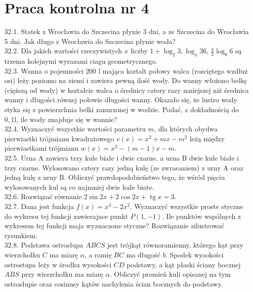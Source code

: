 \documentclass[10pt]{article}
\begin{document}
\section*{Praca kontrolna nr 4}
32.1. Statek z Wrocławia do Szczecina płynie 3 dni, a ze Szczecina do Wrocławia 5 dni. Jak długo z Wrocławia do Szczecina płynie woda?\\
32.2. Dla jakich wartości rzeczywistych $x$ liczby $1+\log _{2} 3, \log _{x} 36$, $\frac{4}{3} \log _{8} 6$ są trzema kolejnymi wyrazami ciagu geometrycznego.\\
32.3. Wanna o pojemności 200 l mająca ksztalt połowy walca (rozciętego wzdłuż osi) leży poziomo na ziemi i zawiera pewną ilość wody. Do wanny włożono belkę (cięższą od wody) w kształcie walca o średnicy cztery razy mniejszej niż średnica wanny i długości równej połowie długości wanny. Okazało się, że lustro wody styka się z powierzchnia belki zanurzonej w wodzie. Podać, z dokładnością do $0,1 \mathrm{l}$, ile wody znajduje się w wannie?\\
32.4. Wyznaczyć wszystkie wartości parametru $m$, dla których obydwa pierwiastki trójmianu kwadratowego $v(x)=x^{2}+m x-m^{2}$ leżą między pierwiastkami trójmianu $w(x)=x^{2}-(m-1) x-m$.\\
32.5. Urna A zawiera trzy kule białe i dwie czarne, a urna B dwie kule białe i trzy czarne. Wylosowano cztery razy jedną kulę (ze zwracaniem) z urny A oraz jedną kulę z urny B. Obliczyć prawdopodobieństwo tego, że wśród pięciu wylosowanych kul są co najmniej dwie kule biate.\\
32.6. Rozwiązać równanie $2 \sin 2 x+2 \cos 2 x+\operatorname{tg} x=3$.\\
32.7. Dana jest funkcja $f(x)=x^{4}-2 x^{2}$. Wyznaczyć wszystkie proste styczne do wykresu tej funkcji zawierajace punkt $P(1,-1)$. Ile punktów wspólnych z wykresem tej funkcji maja wyznaczone styczne? Rozwiązanie zilustrować rysunkiem.\\
32.8. Podstawa ostrosłupa $A B C S$ jest trójkąt równoramienny, którego kạt przy wierzchołku $C$ ma miarę $\alpha$, a ramię $B C$ ma długość $b$. Spodek wysokości ostrostupa leży w środku wysokości $C D$ podstawy, a kąt płaski ściany bocznej $A B S$ przy wierzchołku ma miarę $\alpha$. Obliczyć promień kuli opisanej na tym ostrosłupie oraz cosinusy kątów nachylenia ścian bocznych do podstawy.
\end{document}
